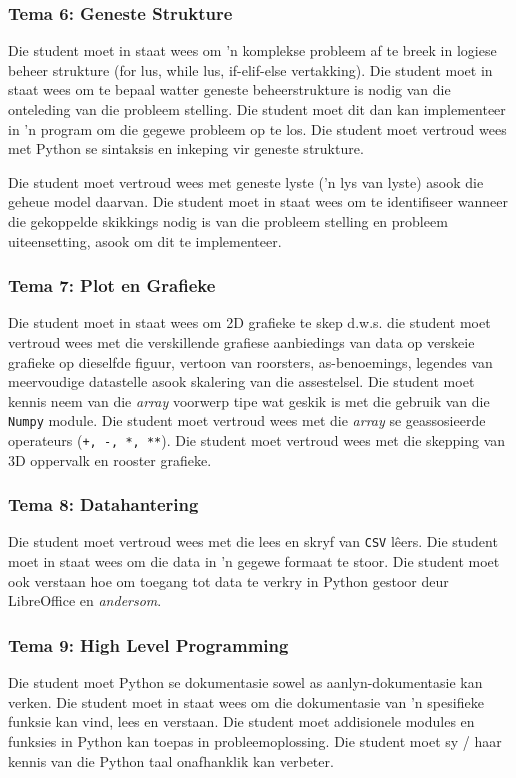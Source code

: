 \subsubsection {Tema 6: Geneste Strukture} 
	             Die student moet in staat wees om 'n komplekse probleem af te breek in logiese beheer strukture (for lus, while lus, if-elif-else vertakking). Die 
             student moet in staat wees om te bepaal watter geneste beheerstrukture is nodig 
             van die onteleding van die probleem stelling. Die student moet dit dan kan implementeer
	   in 'n program om die gegewe 
             probleem op te los. Die student moet vertroud wees met Python se  
             sintaksis en inkeping vir geneste strukture.

	Die student moet vertroud wees met geneste lyste ('n lys van lyste) asook die geheue model daarvan.	
	 Die student moet in staat wees om te identifiseer 
             wanneer die gekoppelde skikkings nodig is van die probleem stelling en
             probleem uiteensetting, asook om dit te implementeer.
                
\subsubsection {Tema 7: Plot en Grafieke} 
         Die student moet in staat wees om 2D grafieke te skep d.w.s. die student 
         moet vertroud wees met die verskillende grafiese aanbiedings van data op verskeie
	grafieke op dieselfde figuur, vertoon van roorsters, as-benoemings, legendes van meervoudige
	datastelle asook skalering van die assestelsel. Die student moet kennis neem van die \textit{array}
	voorwerp tipe wat geskik is met die gebruik van die \texttt {Numpy} module. Die student moet
	vertroud wees met die \textit{array} se geassosieerde operateurs (\texttt {+, -, *, **}). Die student
	moet vertroud wees met die skepping van 3D oppervalk en rooster grafieke.

\subsubsection {Tema 8: Datahantering} 
         Die student moet vertroud wees met die lees en skryf
         van \texttt {CSV} l\^eers. 
         Die student moet in staat wees om die data in 'n gegewe formaat te stoor.
	Die student moet ook verstaan ​​hoe om toegang tot data te verkry in Python
         gestoor deur LibreOffice en \textit {andersom}.

	\subsubsection {Tema 9: High Level Programming} 
                 Die student moet Python se dokumentasie 
                 sowel as aanlyn-dokumentasie kan verken. Die student moet in staat wees om die dokumentasie van 'n spesifieke funksie kan vind, lees en verstaan. Die student moet addisionele modules en funksies in Python kan
                 toepas in probleemoplossing. Die student moet sy / haar kennis van die Python taal 	
		onafhanklik kan verbeter.

